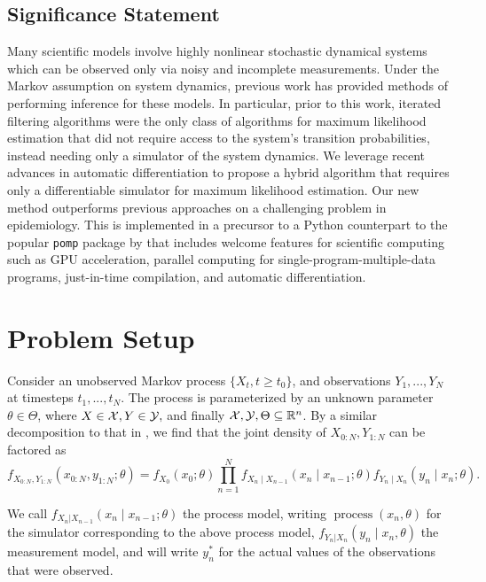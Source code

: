 \documentclass{article}
\begin{document}
\subsection{Significance Statement}
Many scientific models involve highly nonlinear stochastic dynamical systems which can be observed only via noisy and incomplete measurements. Under the Markov assumption on system dynamics, previous work has provided methods of performing inference for these models. In particular, prior to this work, iterated filtering algorithms were the only class of algorithms for maximum likelihood estimation that did not require access to the system's transition probabilities, instead needing only a simulator of the system dynamics. We leverage recent advances in automatic differentiation to propose a hybrid algorithm that requires only a differentiable simulator for maximum likelihood estimation. Our new method outperforms previous approaches on a challenging problem in epidemiology. This is implemented in a precursor to a Python counterpart to the popular \texttt{pomp} package by \citet{king2016pomp, king2017pompmanual} that includes welcome features for scientific computing such as GPU acceleration, parallel computing for single-program-multiple-data programs, just-in-time compilation, and automatic differentiation.


\section{Problem Setup}

Consider an unobserved Markov process $\{X_t, t \geq t_0\}$, and observations $Y_1,...,Y_N$ at timesteps $t_1,..., t_N$. The process is parameterized by an unknown parameter $\theta \in \Theta$, where $X \in {\mathcal{X}}, Y \in {\mathcal{Y}},$ and finally ${\mathcal{X}}, {\mathcal{Y}}, \Theta \subseteq \mathbb{R}^n$. By a similar decomposition to that in \citet{doucet2009tutorial}, we find that the joint density of $X_{0:N}, Y_{1:N}$ can be factored as
$$f_{X_{0: N}, Y_{1: N}}\left(x_{0: N}, y_{1: N} ; \theta\right)=f_{X_0}\left(x_0 ; \theta\right) \prod_{n=1}^N f_{X_n \mid X_{n-1}}\left(x_n \mid x_{n-1} ; \theta\right) f_{Y_n \mid X_n}\left(y_n \mid x_n ; \theta\right).$$

We call $f_{X_n|X_{n-1}}\left(x_{n} \mid x_{n-1}; \theta\right)$ the process model, writing $\operatorname{process}\left(x_n, \theta\right)$ for the simulator corresponding to the above process model, $f_{Y_n|X_n}\left(y_n \mid x_n, \theta\right)$ the measurement model, and will write $y_n^*$ for the actual values of the observations that were observed.
\end{document}

